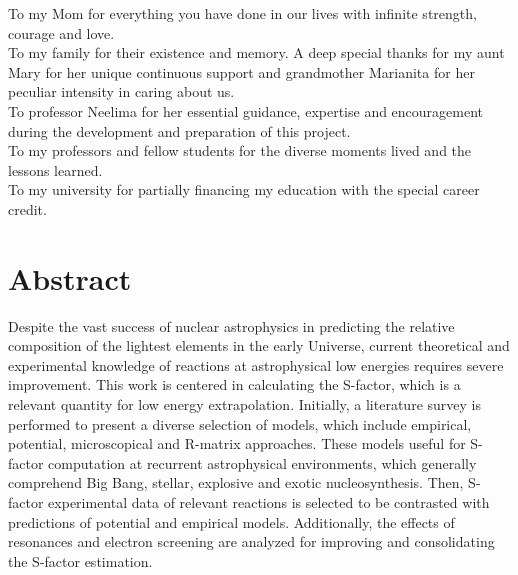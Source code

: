 \documentclass[openany]{book}
\begin{document}
To my Mom for everything you have done in our lives with infinite strength, courage and love. \\

To my family for their existence and memory. A deep special thanks for my aunt Mary for her unique continuous support and grandmother Marianita for her peculiar intensity in caring about us. \\

To professor Neelima for her essential guidance, expertise and encouragement during the development and preparation of this project.  \\ 

To my professors and fellow students for the diverse moments lived and the lessons learned. \\

To my university for partially financing my education with the special career credit.  \\

\chapter*{Abstract}

Despite the vast success of nuclear astrophysics in predicting the relative composition of the lightest elements in the early Universe, current theoretical and experimental knowledge of reactions at astrophysical low energies requires severe improvement. This work is centered in calculating the S-factor, which is a relevant quantity for low energy extrapolation. Initially, a literature survey is performed to present a diverse selection of models, which include empirical, potential, microscopical and R-matrix approaches. These models useful for S-factor computation at recurrent astrophysical environments, which generally comprehend Big Bang, stellar, explosive and exotic nucleosynthesis. Then, S-factor experimental data of relevant reactions is selected to be contrasted with predictions of potential and empirical models. Additionally, the effects of resonances and electron screening are analyzed for improving and consolidating the S-factor estimation. \\
\end{document}
